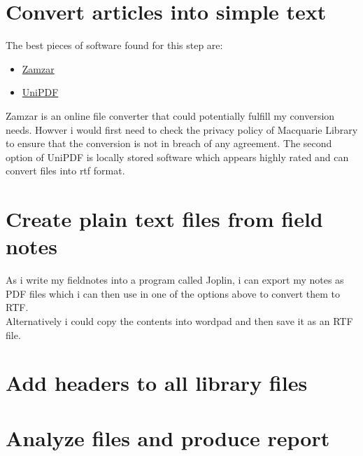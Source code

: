 \documentclass{article}
\begin{document}
\section{Convert articles into simple text}
The best pieces of software found for this step are:
\begin{itemize}
    \item \hyperlink{https://www.zamzar.com/}{Zamzar}
    \item \hyperlink{https://unipdf.com/#howto}{UniPDF}
\end{itemize}
Zamzar is an online file converter that could potentially fulfill my conversion needs. Howver i would first need to check the privacy policy of Macquarie Library to ensure that the conversion is not in breach of any agreement. The second option of UniPDF is locally stored software which appears highly rated and can convert files into rtf format. 

\section{Create plain text files from field notes}
As i write my fieldnotes into a program called Joplin, i can export my notes as PDF files which i can then use in one of the options above to convert them to RTF.\\
\linebreak
Alternatively i could copy the contents into wordpad and then save it as an RTF file.

\section{Add headers to all library files}

\section{Analyze files and produce report}
\
\end{document}

